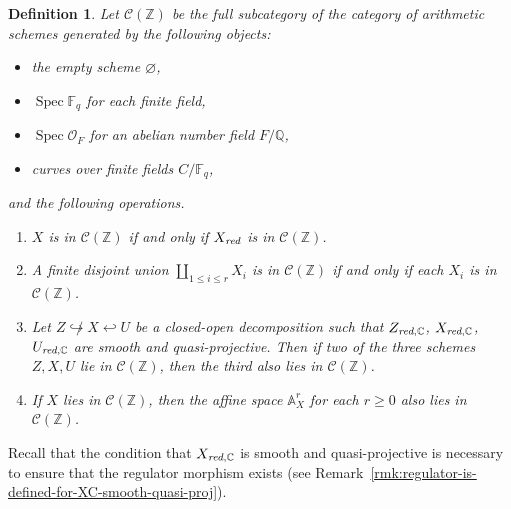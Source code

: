 \documentclass[10pt,a4paper,oneside,draft]{article}
\DeclareMathOperator{\Spec}{Spec}
\newcommand{\CC}{\mathbb{C}}
\newcommand{\FF}{\mathbb{F}}
\newcommand{\QQ}{\mathbb{Q}}
\newcommand{\ZZ}{\mathbb{Z}}
\renewcommand{\AA}{\mathbb{A}}
\renewcommand{\emptyset}{\varnothing}
\newcommand{\red}{\text{\it red}}
\theoremstyle{myplain}
\theoremstyle{mydefinition}
\newtheorem{definition}[theorem]{Definition}
\numberwithin{equation}{section}
\begin{document}
\begin{definition}
  Let $\mathcal{C} (\ZZ)$ be the full subcategory of the category of arithmetic
  schemes generated by the following objects:
  \begin{itemize}
  \item the empty scheme $\emptyset$,
  \item $\Spec \FF_q$ for each finite field,
  \item $\Spec \mathcal{O}_F$ for an abelian number field $F/\QQ$,
  \item curves over finite fields $C/\FF_q$,
  \end{itemize}
  and the following operations.
  \begin{enumerate}
  \item[$\mathcal{C}0)$] $X$ is in $\mathcal{C} (\ZZ)$ if and only if $X_\red$
    is in $\mathcal{C} (\ZZ)$.

  \item[$\mathcal{C}1)$] A finite disjoint union $\coprod_{1 \le i \le r} X_i$
    is in $\mathcal{C} (\ZZ)$ if and only if each $X_i$ is in
    $\mathcal{C} (\ZZ)$.

  \item[$\mathcal{C}2)$] Let $Z \not\hookrightarrow X \hookleftarrow U$ be a
    closed-open decomposition such that $Z_{\red,\CC}$, $X_{\red,\CC}$,
    $U_{\red,\CC}$ are smooth and quasi-projective. Then if two of the three
    schemes $Z,X,U$ lie in $\mathcal{C} (\ZZ)$, then the third also lies in
    $\mathcal{C} (\ZZ)$.

  \item[$\mathcal{C}3)$] If $X$ lies in $\mathcal{C} (\ZZ)$, then the affine
    space $\AA^r_X$ for each $r \ge 0$ also lies in $\mathcal{C} (\ZZ)$.
  \end{enumerate}
\end{definition}

Recall that the condition that $X_{\red,\CC}$ is smooth and quasi-projective is
necessary to ensure that the regulator morphism exists (see
Remark~\ref{rmk:regulator-is-defined-for-XC-smooth-quasi-proj}).
\end{document}
